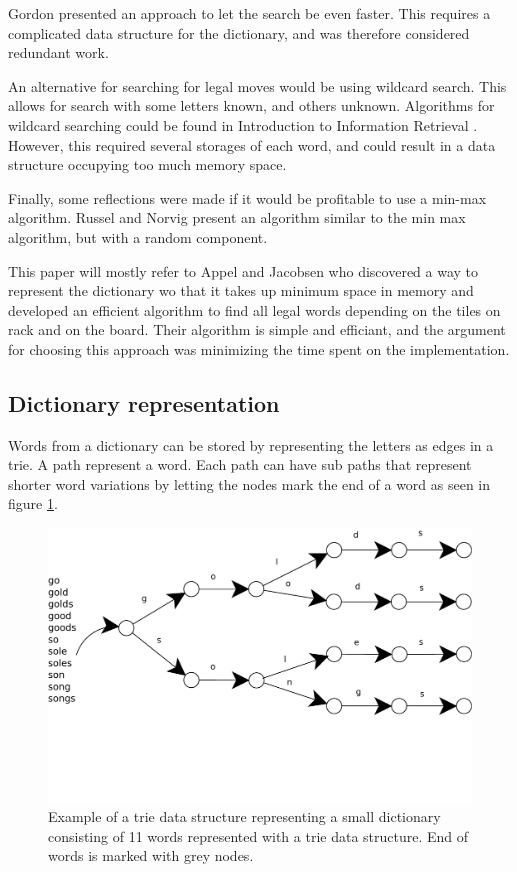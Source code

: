 \documentclass[a4paper, 12pt]{report}
\begin{document}
Gordon\cite{faster} presented an approach to let the search be even faster. This requires a complicated data structure for the dictionary, and was therefore considered redundant work. 

An alternative for searching for legal moves would be using wildcard search. This allows for search with some letters known, and others unknown. Algorithms for wildcard searching could be found in Introduction to Information Retrieval \cite{inforetrieve}. However, this required several storages of each word, and could result in a data structure occupying too much memory space.

Finally, some reflections were made if it would be profitable to use a min-max algorithm. Russel and Norvig\cite{ai} present an algorithm similar to the min max algorithm, but with a random component. 

This paper will mostly refer to Appel and Jacobsen \cite{fastest} who discovered a way to represent the dictionary wo that it takes up minimum space in memory and developed an efficient algorithm to find all legal words depending on the tiles on rack and on the board. Their algorithm is simple and efficiant, and the argument for choosing this approach was minimizing the time spent on the implementation.

\subsection{Dictionary representation}
\label{dic-rep}
Words from a dictionary can be stored by representing the letters as edges in a trie. A path represent a word. Each path can have sub paths that represent shorter word variations by letting the nodes mark the end of a word as seen in figure \ref{fig:trie}. 

\begin{figure}[h]
\centering
\includegraphics[scale=1]{trie}
\caption{Example of a trie data structure representing a small dictionary consisting of 11 words represented with a trie data structure. End of words is marked with grey nodes.}
\label{fig:trie}
\end{figure}
\end{document}
